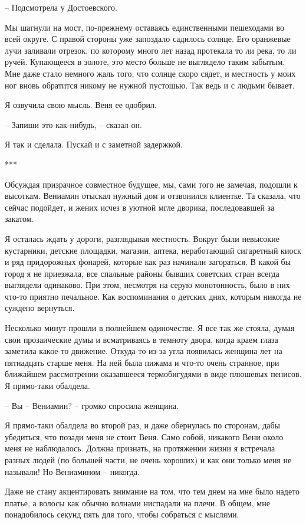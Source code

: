 \documentclass[
]{book}
\begin{document}
-- Подсмотрела у Достоевского.

Мы шагнули на мост, по-прежнему оставаясь единственными пешеходами во всей округе. С правой стороны уже запоздало садилось солнце. Его оранжевые лучи заливали отрезок, по которому много лет назад протекала то ли река, то ли ручей. Купающееся в золоте, это место больше не выглядело таким забытым. Мне даже стало немного жаль того, что солнце скоро сядет, и местность у моих ног вновь обратится никому не нужной пустошью. Так ведь и с людьми бывает.

Я озвучила свою мысль. Веня ее одобрил.

-- Запиши это как-нибудь, -- сказал он.

Я так и сделала. Пускай и с заметной задержкой.

***

Обсуждая призрачное совместное будущее, мы, сами того не замечая, подошли к высоткам. Вениамин отыскал нужный дом и отзвонился клиентке. Та сказала, что сейчас подойдет, и жених исчез в уютной мгле дворика, последовавшей за закатом.

Я осталась ждать у дороги, разглядывая местность. Вокруг были невысокие кустарники, детские площадки, магазин, аптека, неработающий сигаретный киоск и ряд придорожных фонарей, которые как раз начинали загораться. В какой бы город я не приезжала, все спальные районы бывших советских стран всегда выглядели одинаково. При этом, несмотря на серую монотонность, было в них что-то приятно печальное. Как воспоминания о детских днях, которым никогда не суждено вернуться.

Несколько минут прошли в полнейшем одиночестве. Я все так же стояла, думая свои прозаические думы и всматриваясь в темноту двора, когда краем глаза заметила какое-то движение. Откуда-то из-за угла появилась женщина лет на пятнадцать старше меня. На ней была пижама и что-то очень странное, при ближайшем рассмотрении оказавшееся термобигудями в виде плюшевых пенисов. Я прямо-таки обалдела.

-- Вы -- Вениамин? -- громко спросила женщина.

Я прямо-таки обалдела во второй раз, и даже обернулась по сторонам, дабы убедиться, что позади меня не стоит Веня. Само собой, никакого Вени около меня не наблюдалось. Должна признать, на протяжении жизни я встречала разных людей (по большей части, не очень хороших) и как они только меня не называли! Но Вениамином -- никогда.

Даже не стану акцентировать внимание на том, что тем днем на мне было надето платье, а волосы как обычно волнами ниспадали на плечи. В общем, мне понадобилось секунд пять для того, чтобы собраться с мыслями.
\end{document}
